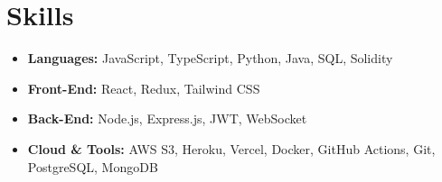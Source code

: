 \documentclass[11pt]{article}
\begin{document}
\section*{Skills}
\begin{itemize}[leftmargin=*, nosep, itemsep=2pt]
    \item \textbf{Languages:} JavaScript, TypeScript, Python, Java, SQL, Solidity
    \item \textbf{Front-End:} React, Redux, Tailwind CSS
    \item \textbf{Back-End:} Node.js, Express.js, JWT, WebSocket
    \item \textbf{Cloud \& Tools:} AWS S3, Heroku, Vercel, Docker, GitHub Actions, Git, PostgreSQL, MongoDB
\end{itemize}
\end{document}
